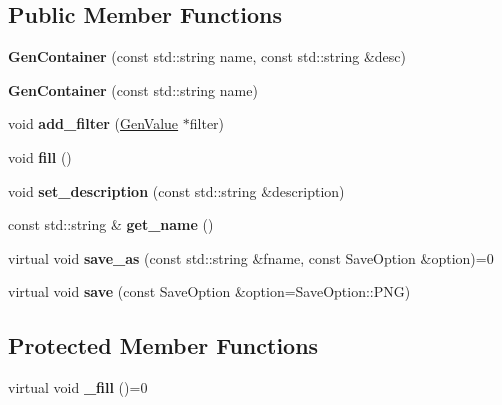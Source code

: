 \subsection*{Public Member Functions}
\begin{DoxyCompactItemize}
\item 
\hypertarget{classfv_1_1GenContainer_acd03ede0e7e0cf362011e5614c787c7b}{}\label{classfv_1_1GenContainer_acd03ede0e7e0cf362011e5614c787c7b} 
{\bfseries Gen\+Container} (const std\+::string name, const std\+::string \&desc)
\item 
\hypertarget{classfv_1_1GenContainer_a34630bea6b7a4f97507420997122ae38}{}\label{classfv_1_1GenContainer_a34630bea6b7a4f97507420997122ae38} 
{\bfseries Gen\+Container} (const std\+::string name)
\item 
\hypertarget{classfv_1_1GenContainer_a5ec383ec157a845610061c3e50f275ac}{}\label{classfv_1_1GenContainer_a5ec383ec157a845610061c3e50f275ac} 
void {\bfseries add\+\_\+filter} (\hyperlink{classfv_1_1GenValue}{Gen\+Value} $\ast$filter)
\item 
\hypertarget{classfv_1_1GenContainer_af9b35ceab9c8238f0d7b51174a28aad9}{}\label{classfv_1_1GenContainer_af9b35ceab9c8238f0d7b51174a28aad9} 
void {\bfseries fill} ()
\item 
\hypertarget{classfv_1_1GenContainer_a58d3266f1dad3fa9b6caa9fdacb57323}{}\label{classfv_1_1GenContainer_a58d3266f1dad3fa9b6caa9fdacb57323} 
void {\bfseries set\+\_\+description} (const std\+::string \&description)
\item 
\hypertarget{classfv_1_1GenContainer_ad21df0a48fca797ff0cc9fec6a0d46f9}{}\label{classfv_1_1GenContainer_ad21df0a48fca797ff0cc9fec6a0d46f9} 
const std\+::string \& {\bfseries get\+\_\+name} ()
\item 
\hypertarget{classfv_1_1GenContainer_a9c4dd0c4bf7017525c2091f356d67d50}{}\label{classfv_1_1GenContainer_a9c4dd0c4bf7017525c2091f356d67d50} 
virtual void {\bfseries save\+\_\+as} (const std\+::string \&fname, const Save\+Option \&option)=0
\item 
\hypertarget{classfv_1_1GenContainer_a092468704245618c0f4e2faf0f0a5efd}{}\label{classfv_1_1GenContainer_a092468704245618c0f4e2faf0f0a5efd} 
virtual void {\bfseries save} (const Save\+Option \&option=Save\+Option\+::\+P\+NG)
\end{DoxyCompactItemize}
\subsection*{Protected Member Functions}
\begin{DoxyCompactItemize}
\item 
\hypertarget{classfv_1_1GenContainer_ad7e9b2f7dcd1cda772e4a1481690897a}{}\label{classfv_1_1GenContainer_ad7e9b2f7dcd1cda772e4a1481690897a} 
virtual void {\bfseries \+\_\+fill} ()=0
\end{DoxyCompactItemize}
